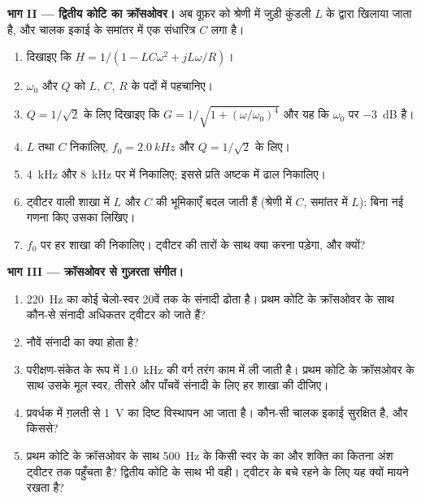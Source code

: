 \begin{problem}
\medskip
\noindent\textbf{भाग II --- द्वितीय कोटि का क्रॉसओवर।}
अब वूफ़र को श्रेणी में जुड़ी कुंडली $L$ के द्वारा खिलाया जाता है, और चालक इकाई
के समांतर में एक संधारित्र $C$ लगा है।
\begin{enumerate}[resume]
  \item दिखाइए कि $\underline H = 1/(1 - LC\omega^2 + jL\omega/R)$।
  \item $\omega_0$ और $Q$ को $L$, $C$, $R$ के पदों में पहचानिए।
  \item $Q = 1/\sqrt2$ के लिए दिखाइए कि $G = 1/\sqrt{1 + (\omega/\omega_0)^4}$
        और यह कि  $\omega_0$ पर \qty{-3}{dB} है।
  \item $L$ तथा $C$ निकालिए, $f_0 = \qty{2.0}{kHz}$ और $Q = 1/\sqrt2$ के लिए।
  \item \qty{4}{kHz} और \qty{8}{kHz} पर  में  निकालिए;
        इससे प्रति अष्टक  में ढाल निकालिए।
  \item ट्वीटर वाली शाखा में $L$ और $C$ की भूमिकाएँ बदल जाती हैं (श्रेणी
        में $C$, समांतर में $L$): बिना नई गणना किए उसका  लिखिए।
  \item $f_0$ पर हर शाखा की  निकालिए। ट्वीटर की तारों के साथ क्या करना
        पड़ेगा, और क्यों?
\end{enumerate}

\medskip
\noindent\textbf{भाग III --- क्रॉसओवर से गुज़रता संगीत।}
\begin{enumerate}[resume]
  \item \qty{220}{Hz} का कोई चेलो-स्वर 20वें तक के संनादी ढोता है।
        प्रथम कोटि के क्रॉसओवर के साथ कौन-से संनादी अधिकतर ट्वीटर को
        जाते हैं?
  \item नौवें संनादी का क्या होता है?
  \item परीक्षण-संकेत के रूप में \qty{1.0}{kHz} की वर्ग तरंग काम में ली
        जाती है। प्रथम कोटि के क्रॉसओवर के साथ उसके मूल स्वर, तीसरे और
        पाँचवें संनादी के लिए हर शाखा की  दीजिए।
  \item प्रवर्धक में ग़लती से \qty{1}{V} का दिष्ट विस्थापन आ जाता है। कौन-सी
        चालक इकाई सुरक्षित है, और किससे?
  \item प्रथम कोटि के क्रॉसओवर के साथ \qty{500}{Hz} के किसी स्वर के
         का और शक्ति का कितना अंश ट्वीटर तक पहुँचता है?
        द्वितीय कोटि के साथ भी वही। ट्वीटर के बचे रहने के लिए यह क्यों
        मायने रखता है?
\end{enumerate}


\end{problem}
